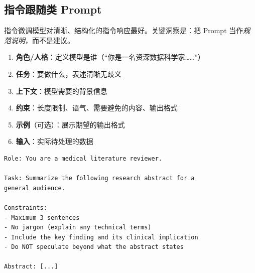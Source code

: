 \subsection{指令跟随类 Prompt}
\label{instruction-following-prompts}

指令微调模型对清晰、结构化的指令响应最好。关键洞察是：把 Prompt 当作\emph{规范说明}，而不是建议。

\begin{keybox}
\begin{enumerate}
  \item \textbf{角色/人格}：定义模型是谁（``你是一名资深数据科学家……''）
  \item \textbf{任务}：要做什么，表述清晰无歧义
  \item \textbf{上下文}：模型需要的背景信息
  \item \textbf{约束}：长度限制、语气、需要避免的内容、输出格式
  \item \textbf{示例}（可选）：展示期望的输出格式
  \item \textbf{输入}：实际待处理的数据
\end{enumerate}
\end{keybox}

\begin{examplebox}
\begin{lstlisting}
Role: You are a medical literature reviewer.

Task: Summarize the following research abstract for a
general audience.

Constraints:
- Maximum 3 sentences
- No jargon (explain any technical terms)
- Include the key finding and its clinical implication
- Do NOT speculate beyond what the abstract states

Abstract: [...]
\end{lstlisting}
\end{examplebox}

